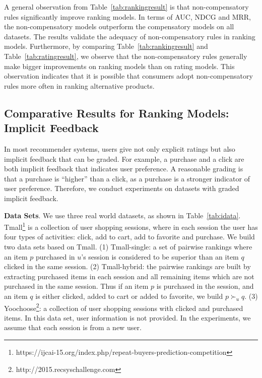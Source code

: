 \documentclass[letterpaper]{article} %
\begin{document}
A general observation from Table~\ref{tab:rankingresult} is that non-compensatory rules significantly improve ranking models. In terms of AUC, NDCG and MRR, the non-compensatory models outperform the compensatory models on all datasets. The results validate the adequacy of non-compensatory rules in ranking  models. Furthermore, by comparing Table~\ref{tab:rankingresult} and Table~\ref{tab:ratingresult}, we observe that the non-compensatory rules generally make bigger improvements on ranking models than on rating models. This observation indicates that it is possible that consumers adopt non-compensatory rules more often in ranking alternative products.
\subsection{Comparative Results for Ranking Models: Implicit Feedback}
In most recommender systems, users give not only explicit ratings but also implicit feedback that can be graded. For example, a purchase and a click are both implicit feedback that indicates user preference. A reasonable grading is that a purchase is ``higher'' than a click, as a purchase is a stronger indicator of user preference. Therefore, we conduct experiments on datasets with graded implicit feedback.  

\begin{table}[htp]
\caption{Statistics of Datasets with graded implicit feedback}
\small
\centering
{}
\label{tab:idata}
\end{table}%

\textbf{Data Sets}. We use three real world datasets, as shown in Table~\ref{tab:idata}. Tmall\footnote{https://ijcai-15.org/index.php/repeat-buyers-prediction-competition} is a collection of user shopping sessions, where in each session the user has four types of activities: click, add to cart, add to favorite and purchase. We build two data sets based on Tmall. (1) Tmall-single: a set of pairwise rankings where an item $p$ purchased in $u$'s session is considered to be superior than an item $q$ clicked in the same session. (2) Tmall-hybrid: the pairwise rankings are built by extracting purchased items in each session and all remaining items which are not purchased in the same session. Thus if an item $p$ is purchased in the session, and an item $q$ is either clicked, added to cart or added to favorite, we build $p\succ_u q$. (3) Yoochoose\footnote{http://2015.recsyschallenge.com}: a collection of user shopping sessions with clicked and purchased items. In this data set, user information is not provided. In the experiments, we assume that each session is from a new user. 
\end{document}
